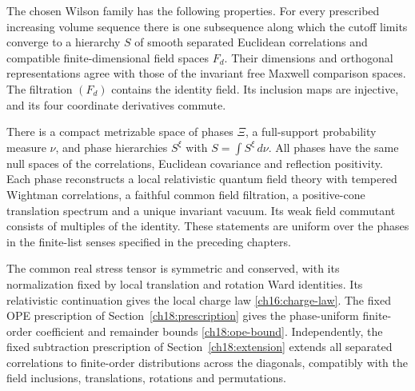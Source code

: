 \begin{theorem}
\label{ch19:conditional}
The chosen Wilson family has the following
properties. For every prescribed increasing volume sequence there is
one subsequence along which the cutoff limits converge to a hierarchy $S$ of smooth separated Euclidean
correlations and compatible finite-dimensional field spaces $F_d$.
Their dimensions and orthogonal representations agree with those of
the invariant free Maxwell comparison spaces. The filtration $(F_d)$ contains the identity field. Its inclusion maps are
injective, and its four coordinate derivatives commute.

There is a compact metrizable space of phases $\Xi$, a full-support
probability measure $\nu$, and phase hierarchies $S^\xi$ with
$S=\int S^\xi\,d\nu$. All phases have the same null spaces of the correlations,
Euclidean covariance and reflection positivity. Each phase reconstructs
a local relativistic quantum field theory with tempered Wightman
correlations, a faithful common field filtration, a positive-cone
translation spectrum and a unique invariant vacuum. Its weak field
commutant consists of multiples of the identity. These statements are uniform over the phases in
the finite-list senses specified in the preceding chapters.

The common real stress tensor is symmetric and conserved, with its
normalization fixed by local translation and rotation Ward identities.
Its relativistic continuation gives the local charge law
\eqref{ch16:charge-law}. The fixed OPE prescription of
Section~\ref{ch18:prescription} gives the phase-uniform finite-order
coefficient and remainder bounds \eqref{ch18:ope-bound}. Independently,
the fixed subtraction prescription
of Section~\ref{ch18:extension} extends all separated correlations to
finite-order distributions across the diagonals, compatibly
with the field inclusions, translations, rotations and permutations.
\end{theorem}
